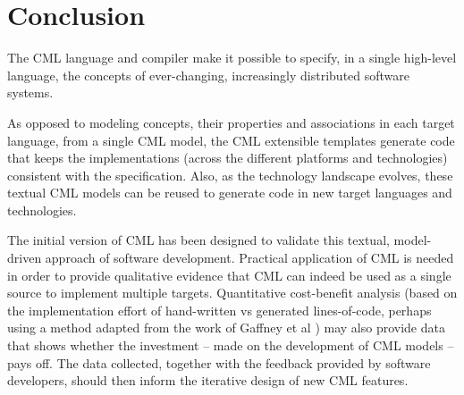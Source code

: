 \section{Conclusion}\label{sec:conclusion}

The CML language and compiler make it possible to specify,
in a single high-level language,
the concepts of ever-changing, increasingly distributed software systems.

As opposed to modeling concepts, their properties and associations in each target language,
from a single CML model,
the CML extensible templates generate code that
keeps the implementations
(across the different platforms and technologies)
consistent with the specification.
Also, as the technology landscape evolves,
these textual CML models can be reused to generate code in new target languages and technologies.

The initial version of CML has been designed to validate this textual, model-driven approach of software development.
Practical application of CML is needed in order to provide qualitative evidence that
CML can indeed be used as a single source to implement multiple targets.
Quantitative cost-benefit analysis
(based on the implementation effort of hand-written vs generated lines-of-code, perhaps using a method adapted from the work of Gaffney et al \cite{gaffney})
may also provide data
that shows whether the investment -- made on the development of CML models -- pays off. The data collected, together with the feedback provided by software developers, should then inform the iterative design of new CML features.
